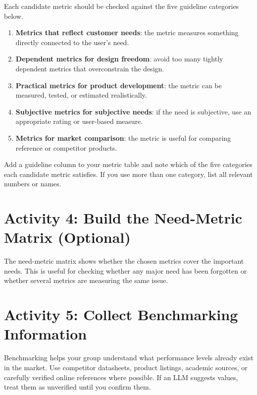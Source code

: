Each candidate metric should be checked against the five guideline categories below.

\begin{enumerate}
    \item \textbf{Metrics that reflect customer needs}: the metric measures something directly connected to the user's need.
    \item \textbf{Dependent metrics for design freedom}: avoid too many tightly dependent metrics that overconstrain the design.
    \item \textbf{Practical metrics for product development}: the metric can be measured, tested, or estimated realistically.
    \item \textbf{Subjective metrics for subjective needs}: if the need is subjective, use an appropriate rating or user-based measure.
    \item \textbf{Metrics for market comparison}: the metric is useful for comparing reference or competitor products.
\end{enumerate}

Add a guideline column to your metric table and note which of the five categories each candidate metric satisfies. If you use more than one category, list all relevant numbers or names.

\section{Activity 4: Build the Need-Metric Matrix (Optional)}

The need-metric matrix shows whether the chosen metrics cover the important needs. This is useful for checking whether any major need has been forgotten or whether several metrics are measuring the same issue.



\section{Activity 5: Collect Benchmarking Information}

Benchmarking helps your group understand what performance levels already exist in the market. Use competitor datasheets, product listings, academic sources, or carefully verified online references where possible. If an LLM suggests values, treat them as unverified until you confirm them.



